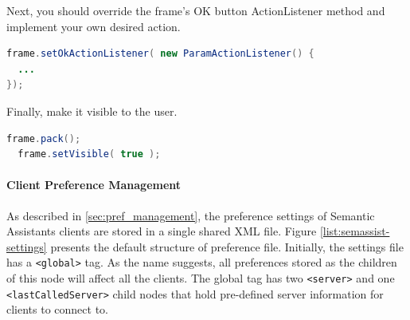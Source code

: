 Next, you should override the frame's OK button ActionListener method and implement your own desired action.

\begin{lstlisting}[language=Java,xleftmargin=4mm,columns=flexible]
frame.setOkActionListener( new ParamActionListener() {
  ...
});
\end{lstlisting}

Finally, make it visible to the user.

\begin{lstlisting}[language=Java,xleftmargin=4mm,columns=flexible]
  frame.pack();
  frame.setVisible( true );
\end{lstlisting}


\label{client_pref}
\paragraph{Client Preference Management}
As described in \ref{sec:pref_management}, the preference settings of Semantic Assistants clients are stored in a single shared XML file. Figure \ref{list:semassist-settings} presents the default structure of preference file. Initially, the settings file has a \texttt{<global>} tag. As the name suggests, all preferences stored as the children of this node will affect all the clients. The global tag has two \texttt{<server>} and one \texttt{<lastCalledServer>} child nodes that hold pre-defined server information for clients to connect to.
 
